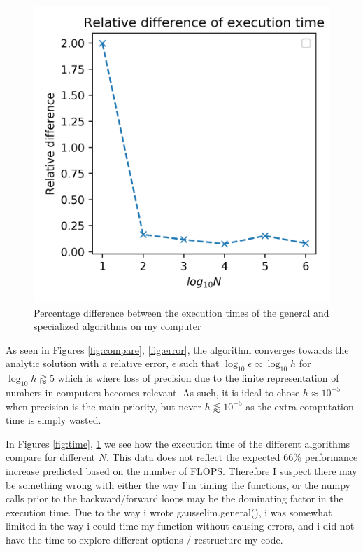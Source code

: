 \documentclass[10pt,showpacs,preprintnumbers,footinbib,amsmath,amssymb,aps,prl,twocolumn,groupedaddress,superscriptaddress,showkeys]{revtex4-1}
\begin{document}
  \begin{figure}[h!]
    \center
    \includegraphics[scale=.7]{figs/ex1d_timediff.png}
    \caption{Percentage difference between the execution times of the general and specialized algorithms on my computer}
    \label{fig:timediff}
  \end{figure}

  As seen in Figures \ref{fig:compare}, \ref{fig:error}, the algorithm converges towards the analytic solution with a relative error, $\epsilon$ such that $\log_{10}\epsilon \propto \log_{10} h$ for $\log_{10}h \gtrapprox 5$ which is where loss of precision due to the finite representation of numbers in computers becomes relevant. As such, it is ideal to chose $h\approx 10^{-5}$ when precision is the main priority, but never $h\lessapprox10^{-5}$ as the extra computation time is simply wasted.

  In Figures \ref{fig:time}, \ref{fig:timediff} we see how the execution time of the different algorithms compare for different $N$. This data does not reflect the expected $66\%$ performance increase predicted based on the number of FLOPS. Therefore I suspect there may be something wrong with either the way I'm timing the functions, or the numpy calls prior to the backward/forward loops may be the dominating factor in the execution time. Due to the way i wrote gausselim.general(), i was somewhat limited in the way i could time my function without causing errors, and i did not have the time to explore different options / restructure my code.
\end{document}
